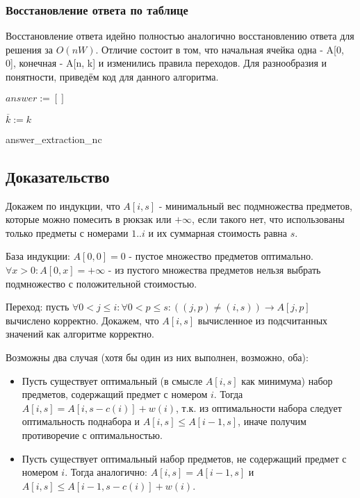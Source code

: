 \documentclass{article}
\begin{document}
\subsubsection{Восстановление ответа по таблице}

Восстановление ответа идейно полностью аналогично восстановлению ответа для решения за $O(nW)$. Отличие состоит в том, что начальная ячейка одна - A[0, 0], конечная - A[n, k] и изменились правила переходов. Для разнообразия и понятности, приведём код для данного алгоритма.

\begin{algorithm}[H]
	\SetAlgoLined %
	
	$answer := []$
	
	$\overline{k} := k$
	
	\caption{answer\_extraction\_nc}
\end{algorithm}

\subsection{Доказательство}

Докажем по индукции, что $A[i, s]$ - минимальный вес подмножества предметов, которые можно помесить в рюкзак или $+\infty$, если такого нет, что использованы только предметы с номерами $1..i$ и их суммарная стоимость равна $s$.

База индукции: $A[0, 0] = 0$ - пустое множество предметов оптимально.
$\forall x > 0: A[0, x] = +\infty$ - из пустого множества предметов нельзя выбрать подмножество с положительной стоимостью.

Переход: пусть $\forall 0 < j \leq i: \forall 0 < p \leq s : ((j, p) \neq (i, s)) \rightarrow A[j, p]$ вычислено корректно. Докажем, что $A[i, s]$ вычисленное из подсчитанных значений как алгоритме корректно.

Возможны два случая (хотя бы один из них выполнен, возможно, оба):

\begin{itemize}
	\item 
	Пусть существует оптимальный (в смысле $A[i, s]$ как минимума) набор предметов, содержащий предмет с номером $i$. Тогда $A[i, s] = A[i, s - c(i)] + w(i)$, т.к. из оптимальности набора следует оптимальность поднабора и $A[i, s] \leq A[i - 1, s]$, иначе получим противоречие с оптимальностью.
	
	\item 
	Пусть существует оптимальный набор предметов, не содержащий предмет с номером $i$. Тогда аналогично: $A[i, s] = A[i-1, s]$ и $A[i, s] \leq A[i-1, s - c(i)] + w(i)$.
	
\end{itemize}
\end{document}
